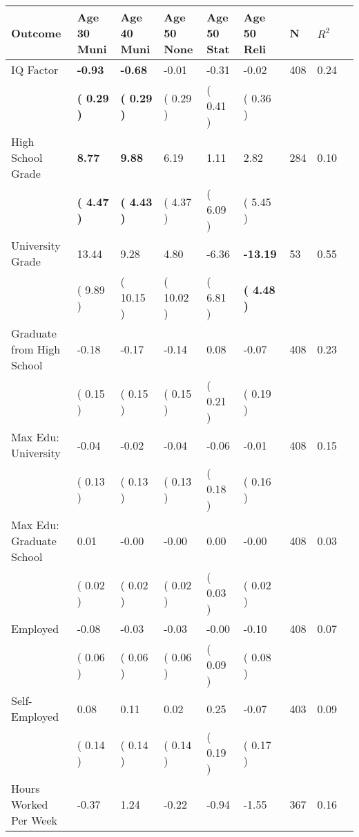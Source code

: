 \begin{tabular}{L{6.2cm} C{1.8cm} C{1.8cm} C{1.8cm} C{1.8cm} C{1.8cm} C{1.8cm} C{0.3cm} C{0.3cm}}
\toprule
 \textbf{Outcome} & \textbf{Age 30 Muni} & \textbf{Age 40 Muni} & \textbf{Age 50 None} & \textbf{Age 50 Stat} & \textbf{Age 50 Reli} & \textbf{N} & \textbf{$ R^2$} \\
\midrule
IQ Factor & \textbf{    -0.93} & \textbf{    -0.68} &     -0.01 &     -0.31 &     -0.02  & 408 &       0.24 \\ 
 & \textbf{(     0.29 )} & \textbf{(     0.29 )} & (     0.29 ) & (     0.41 ) & (     0.36 )  & \\
High School Grade & \textbf{     8.77} & \textbf{     9.88} &      6.19 &      1.11 &      2.82  & 284 &       0.10 \\ 
 & \textbf{(     4.47 )} & \textbf{(     4.43 )} & (     4.37 ) & (     6.09 ) & (     5.45 )  & \\
University Grade &     13.44 &      9.28 &      4.80 &     -6.36 & \textbf{   -13.19}  & 53 &       0.55 \\ 
 & (     9.89 ) & (    10.15 ) & (    10.02 ) & (     6.81 ) & \textbf{(     4.48 )}  & \\
Graduate from High School &     -0.18 &     -0.17 &     -0.14 &      0.08 &     -0.07  & 408 &       0.23 \\ 
 & (     0.15 ) & (     0.15 ) & (     0.15 ) & (     0.21 ) & (     0.19 )  & \\
Max Edu: University &     -0.04 &     -0.02 &     -0.04 &     -0.06 &     -0.01  & 408 &       0.15 \\ 
 & (     0.13 ) & (     0.13 ) & (     0.13 ) & (     0.18 ) & (     0.16 )  & \\
Max Edu: Graduate School &      0.01 &     -0.00 &     -0.00 &      0.00 &     -0.00  & 408 &       0.03 \\ 
 & (     0.02 ) & (     0.02 ) & (     0.02 ) & (     0.03 ) & (     0.02 )  & \\
Employed &     -0.08 &     -0.03 &     -0.03 &     -0.00 &     -0.10  & 408 &       0.07 \\ 
 & (     0.06 ) & (     0.06 ) & (     0.06 ) & (     0.09 ) & (     0.08 )  & \\
Self-Employed &      0.08 &      0.11 &      0.02 &      0.25 &     -0.07  & 403 &       0.09 \\ 
 & (     0.14 ) & (     0.14 ) & (     0.14 ) & (     0.19 ) & (     0.17 )  & \\
Hours Worked Per Week &     -0.37 &      1.24 &     -0.22 &     -0.94 &     -1.55  & 367 &       0.16 \\ 

\end{tabular}
